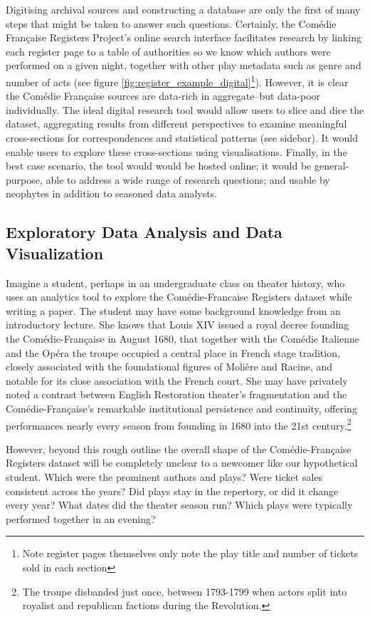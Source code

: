 \documentclass[	DIV=calc,%
							paper=a4,%
							fontsize=11pt,%
							twocolumn]{scrartcl}	 					%
\begin{document}
Digitising archival sources and constructing a database are only the first of many steps that might be taken to answer such questions.  Certainly, the Comédie Française Registers Project's online search interface facilitates research by linking each register page to a table of authorities so we know which authors were performed on a given night, together with other play metadata such as genre and number of acts (see figure \ref{fig:register_example_digital}\footnote{Note register pages themselves only note the play title and number of tickets sold in each section}). However, it is clear the Comédie Française sources are data-rich in aggregate--but data-poor individually.  The ideal digital research tool would allow users to slice and dice the dataset, aggregating results from different perspectives to examine meaningful cross-sections for correspondences and statistical patterns (see sidebar).  It would enable users to explore these cross-sections using visualisations. Finally, in the best case scenario, the tool would would be hosted online; it would be general-purpose, able to address a wide range of research questions; and usable by neophytes in addition to seasoned data analysts.

\subsection*{Exploratory Data Analysis and Data Visualization}

Imagine a student, perhaps in an undergraduate class on theater history, who uses an analytics tool to explore the Comédie-Francaise Registers dataset while writing a paper. The student may have some background knowledge from an introductory lecture.  She knows that Louis XIV issued a royal decree founding the Comédie-Française in August 1680, that together with the Comédie Italienne and the Opéra the troupe occupied a central place in French stage tradition, closely associated with the foundational figures of Molière and Racine, and notable for its close association with the French court.  She may have privately noted a contrast between English Restoration theater’s fragmentation and the Comédie-Française’s remarkable institutional persistence and continuity, offering performances nearly every season from founding in 1680 into the 21st century.\footnote{The troupe disbanded just once, between 1793-1799 when actors split into royalist and republican factions during the Revolution.}

However, beyond this rough outline the overall shape of the Comédie-Française Registers dataset will be completely unclear to a newcomer like our hypothetical student.  Which were the prominent authors and plays? Were ticket sales consistent across the years?  Did plays stay in the repertory, or did it change every year?  What dates did the theater season run?  Which plays were typically performed together in an evening?
\end{document}

